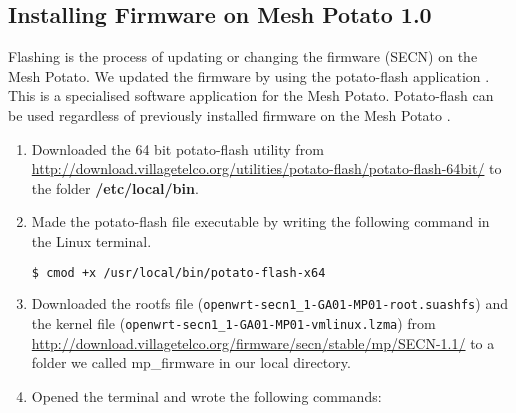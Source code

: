 \subsection{Installing Firmware on Mesh Potato 1.0}

Flashing is the process of updating or changing the firmware (SECN) on the Mesh Potato. We updated the firmware by using the potato-flash application \cite{flashing}. This is a specialised software application for the Mesh Potato. Potato-flash can be used regardless of previously installed firmware on the Mesh Potato \cite{InstallingSecnFirmware}. 

\begin{enumerate}
\item Downloaded the 64 bit potato-flash utility from \url{http://download.villagetelco.org/utilities/potato-flash/potato-flash-64bit/} to the folder \textbf{/etc/local/bin}.
\item Made the potato-flash file executable by writing the following command in the Linux terminal.
\begin{lstlisting}[language=bash]
  $ cmod +x /usr/local/bin/potato-flash-x64
\end{lstlisting}
\item Downloaded the rootfs file (\texttt{openwrt-secn1_1-GA01-MP01-root.suashfs}) and the kernel file (\texttt{openwrt-secn1_1-GA01-MP01-vmlinux.lzma})  from \url{http://download.villagetelco.org/firmware/secn/stable/mp/SECN-1.1/} to a folder we called mp\_firmware in our local directory.
\item Opened the terminal and wrote the following commands: 
\end{enumerate}



